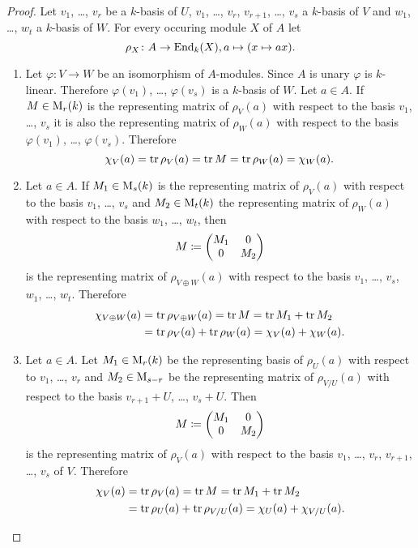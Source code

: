\begin{proof}
 Let $v_1$, \dots, $v_r$ be a $k$-basis of $U$, $v_1$, \dots, $v_r$, $v_{r+1}$, \dots, $v_s$ a $k$-basis of $V$ and $w_1$, \dots, $w_t$ a $k$-basis of $W$. For every occuring module $X$ of $A$ let
 \[
  \rho_X \colon A \to \operatorname{End}_k(X), a \mapsto (x \mapsto ax).
 \]
 \begin{enumerate}[label=\emph{\alph*)},leftmargin=*]
  \item
   Let $\varphi \colon V \to W$ be an isomorphism of $A$-modules. Since $A$ is unary $\varphi$ is $k$-linear. Therefore $\varphi(v_1)$, \dots, $\varphi(v_s)$ is a $k$-basis of $W$. Let $a \in A$. If $M \in \operatorname{M}_r(k)$ is the representing matrix of $\rho_V(a)$ with respect to the basis $v_1$, \dots, $v_s$ it is also the representing matrix of $\rho_W(a)$ with respect to the basis $\varphi(v_1)$, \dots, $\varphi(v_s)$. Therefore
   \[
    \chi_V(a) = \operatorname{tr} \rho_V(a) = \operatorname{tr} M = \operatorname{tr} \rho_W(a) = \chi_W(a).
   \]
  \item
   Let $a \in A$. If $M_1 \in \operatorname{M}_s(k)$ is the representing matrix of $\rho_V(a)$ with respect to the basis $v_1$, \dots, $v_s$ and $M_2 \in \operatorname{M}_t(k)$ the representing matrix of $\rho_W(a)$ with respect to the basis $w_1$, \dots, $w_t$, then
   \[
    M \coloneqq \begin{pmatrix}M_1 & 0  \\ 0 & M_2\end{pmatrix}
   \]
   is the representing matrix of $\rho_{V \oplus W}(a)$ with respect to the basis $v_1$, \dots, $v_s$, $w_1$, \dots, $w_t$. Therefore
   \begin{align*}
    \chi_{V \oplus W}(a)
    &= \operatorname{tr} \rho_{V \oplus W}(a)
    = \operatorname{tr} M
    = \operatorname{tr} M_1 + \operatorname{tr} M_2 \\
    &= \operatorname{tr} \rho_V(a) + \operatorname{tr} \rho_W(a)
    = \chi_V(a) + \chi_W(a).
   \end{align*}
  \item
   Let $a \in A$. Let $M_1 \in \operatorname{M}_r(k)$ be the representing basis of $\rho_U(a)$ with respect to $v_1$, \dots, $v_r$ and $M_2 \in \operatorname{M}_{s-r}$ be the representing matrix of $\rho_{V/U}(a)$ with respect to the basis $v_{r+1} + U$, \dots, $v_s + U$. Then
   \[
    M \coloneqq \begin{pmatrix}M_1 & 0 \\ 0 & M_2\end{pmatrix}
   \]
   is the representing matrix of $\rho_V(a)$ with respect to the basis $v_1$, \dots, $v_r$, $v_{r+1}$, \dots, $v_s$ of $V$. Therefore
   \begin{align*}
    \chi_V(a)
    &= \operatorname{tr} \rho_V(a)
    = \operatorname{tr} M
    = \operatorname{tr} M_1 + \operatorname{tr} M_2 \\
    &= \operatorname{tr} \rho_U(a) + \operatorname{tr} \rho_{V/U}(a)
    = \chi_U(a) + \chi_{V/U}(a).
   \end{align*}

\end{enumerate}
\end{proof}
